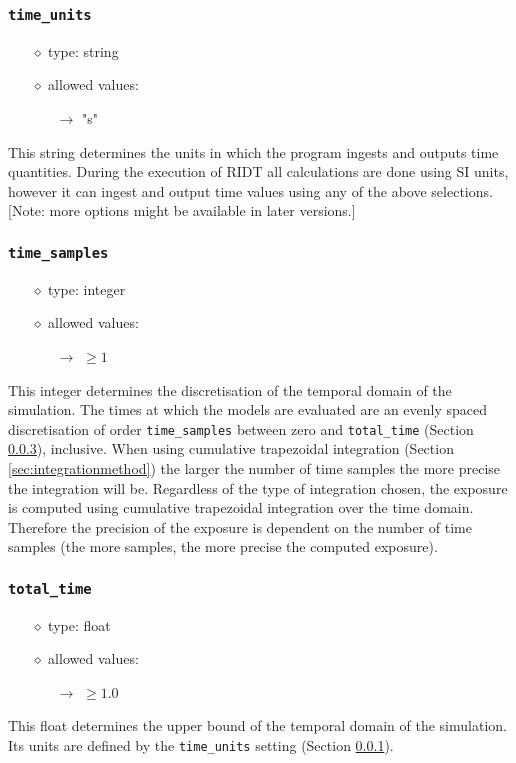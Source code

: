\documentclass[]{article}
\def\code#1{\texttt{#1}}
\begin{document}
\subsubsection{\code{time\_units}}\label{sec:timeunits}
\begin{itemize}
    \item[$\diamond$] type: string 
    \item[$\diamond$] allowed values:
    \begin{itemize}
        \item[$\rightarrow$] "s"
    \end{itemize}
\end{itemize}
This string determines the units in which the program ingests and outputs time
quantities. During the execution of RIDT all calculations are done using SI
units, however it can ingest and output time values using any of the above
selections. [Note: more options might be available in later versions.]

\subsubsection{\code{time\_samples}}\label{sec:timesamples}
\begin{itemize}
    \item[$\diamond$] type: integer 
    \item[$\diamond$] allowed values:
    \begin{itemize}
        \item[$\rightarrow$] $\geq1$
    \end{itemize}
\end{itemize}
This integer determines the discretisation of the temporal domain of the
simulation. The times at which the models are evaluated are an evenly spaced
discretisation of order \code{time\_samples} between zero and \code{total\_time}
(Section \ref{sec:totaltime}), inclusive. When using cumulative trapezoidal
integration (Section \ref{sec:integrationmethod}) the larger the number of time
samples the more precise the integration will be. Regardless of the type of
integration chosen, the exposure is computed using cumulative trapezoidal
integration over the time domain. Therefore the precision of the exposure is
dependent on the number of time samples (the more samples, the more precise the
computed exposure).

\subsubsection{\code{total\_time}}\label{sec:totaltime}
\begin{itemize}
    \item[$\diamond$] type: float 
    \item[$\diamond$] allowed values:
    \begin{itemize}
        \item[$\rightarrow$] $\geq1.0$
    \end{itemize}
\end{itemize}
This float determines the upper bound of the temporal domain of the simulation.
Its units are defined by the \code{time\_units} setting (Section
\ref{sec:timeunits}).
\end{document}
